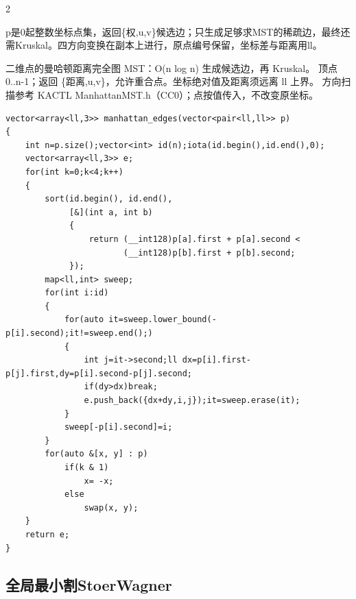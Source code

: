 \documentclass[UTF8,fontset=fandol,a4paper,twoside]{ctexart}
\newcommand{\note}[1]{{\fontsize{10}{12}\selectfont #1\par}}
\begin{document}
\begin{multicols}{2}
\note{p是0起整数坐标点集，返回\{权,\allowbreak{}u,\allowbreak{}v\}候选边；只生成足够求MST的稀疏边，最终还需Kruskal。四方向变换在副本上进行，原点编号保留，坐标差与距离用ll。}
\note{二维点的曼哈顿距离完全图 MST：O(\allowbreak{}n log n)\allowbreak{} 生成候选边，再 Kruskal。 顶点 0.\allowbreak{}.\allowbreak{}n-\allowbreak{}1；返回 \{距离,\allowbreak{}u,\allowbreak{}v\}，允许重合点。坐标绝对值及距离须远离 ll 上界。 方向扫描参考 KACTL ManhattanMST.\allowbreak{}h（CC0）；点按值传入，不改变原坐标。}
\begin{lstlisting}
vector<array<ll,3>> manhattan_edges(vector<pair<ll,ll>> p)
{
    int n=p.size();vector<int> id(n);iota(id.begin(),id.end(),0);
    vector<array<ll,3>> e;
    for(int k=0;k<4;k++)
    {
        sort(id.begin(), id.end(),
             [&](int a, int b)
             {
                 return (__int128)p[a].first + p[a].second <
                        (__int128)p[b].first + p[b].second;
             });
        map<ll,int> sweep;
        for(int i:id)
        {
            for(auto it=sweep.lower_bound(-p[i].second);it!=sweep.end();)
            {
                int j=it->second;ll dx=p[i].first-p[j].first,dy=p[i].second-p[j].second;
                if(dy>dx)break;
                e.push_back({dx+dy,i,j});it=sweep.erase(it);
            }
            sweep[-p[i].second]=i;
        }
        for(auto &[x, y] : p)
            if(k & 1)
                x= -x;
            else
                swap(x, y);
    }
    return e;
}
\end{lstlisting}
\subsection{全局最小割StoerWagner}


\end{multicols}
\end{document}
